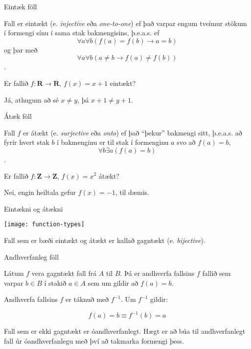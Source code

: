 \documentclass{beamer}
\begin{document}
\begin{frame}{Eintæk föll}
\begin{tcolorbox}[title=Eintækt fall]
Fall er eintækt (e. \emph{injective} eða \emph{one-to-one}) ef það varpar engum tveimur stökum í formengi sínu í sama stak bakmengisins, þ.e.a.s. ef \[\forall a \forall b (f(a) = f(b) \to a = b)\] og þar með \[\forall a \forall b (a \neq b \to f(a) \neq f(b))\].
\end{tcolorbox}

Er fallið $f: \mathbf{R} \to \mathbf{R}$, $f(x) = x + 1$ eintækt? \pause

Já, athugum að sé $x \neq y$, þá $x + 1 \neq y + 1$.
\end{frame}

\begin{frame}{Átæk föll}
\begin{tcolorbox}[title=Átækt fall]
Fall $f$ er átækt (e. \emph{surjective} eða \emph{onto}) ef það ``þekur'' bakmengi sitt, þ.e.a.s. að fyrir hvert stak $b$ í bakmenginu er til stak í formenginu $a$ svo að $f(a) = b$, \[\forall b \exists a (f(a) = b)\].
\end{tcolorbox}
Er fallið $f: \mathbf{Z} \to \mathbf{Z}$, $f(x) = x^2$ átækt? \pause

Nei, engin heiltala gefur $f(x) = -1$, til dæmis.
\end{frame}

\begin{frame}{Eintækni og átækni}
\begin{center}
\texttt{[image: function-types]}
\end{center}
Fall sem er bæði eintækt og átækt er kallað gagntækt (e. \emph{bijective}).
\end{frame}

\begin{frame}{Andhverfanleg föll}
\begin{tcolorbox}[title=Andhverfanlegt fall]
Látum $f$ vera gagntækt fall frá $A$ til $B$. Þá er andhverfa fallsins $f$ fallið sem varpar $b \in B$ í stakið $a \in A$ sem um gildir að $f(a) = b$.

Andhverfa fallsins $f$ er táknuð með $f^{-1}$. Um $f^{-1}$ gildir:

\[
 f(a) = b \equiv f^{-1}(b) = a
\]

\end{tcolorbox}
Fall sem er ekki gagntækt er óandhverfanlegt. Hægt er að búa til andhverfanlegt fall úr óandhverfanlegu með því að takmarka formengi þess.
\end{frame}
\end{document}

